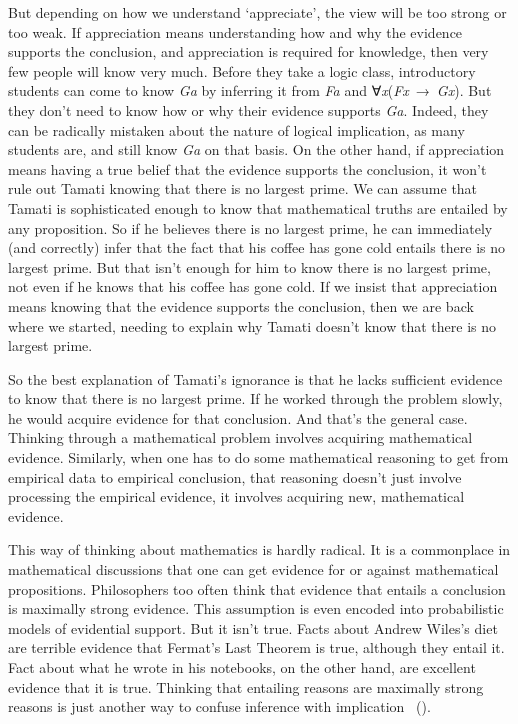 \documentclass[
  10pt,
  letterpaper,
  twoside]{scrbook}
\begin{document}
But depending on how we understand `appreciate', the view will be too
strong or too weak. If appreciation means understanding how and why the
evidence supports the conclusion, and appreciation is required for
knowledge, then very few people will know very much. Before they take a
logic class, introductory students can come to know \emph{Ga} by
inferring it from \emph{Fa} and ∀\emph{x}(\emph{Fx}~→~\emph{Gx}). But
they don't need to know how or why their evidence supports \emph{Ga}.
Indeed, they can be radically mistaken about the nature of logical
implication, as many students are, and still know \emph{Ga} on that
basis. On the other hand, if appreciation means having a true belief
that the evidence supports the conclusion, it won't rule out {Tamati}
knowing that there is no largest prime. We can assume that {Tamati} is
sophisticated enough to know that mathematical truths are entailed by
any proposition. So if he believes there is no largest prime, he can
immediately (and correctly) infer that the fact that his coffee has gone
cold entails there is no largest prime. But that isn't enough for him to
know there is no largest prime, not even if he knows that his coffee has
gone cold. If we insist that appreciation means knowing that the
evidence supports the conclusion, then we are back where we started,
needing to explain why {Tamati} doesn't know that there is no largest
prime.

So the best explanation of {Tamati}'s ignorance is that he lacks
sufficient evidence to know that there is no largest prime. If he worked
through the problem slowly, he would acquire evidence for that
conclusion. And that's the general case. Thinking through a mathematical
problem involves acquiring mathematical evidence. Similarly, when one
has to do some mathematical reasoning to get from empirical data to
empirical conclusion, that reasoning doesn't just involve processing the
empirical evidence, it involves acquiring new, mathematical evidence.

This way of thinking about mathematics is hardly radical. It is a
commonplace in mathematical discussions that one can get evidence for or
against mathematical propositions. Philosophers too often think that
evidence that entails a conclusion is maximally strong evidence. This
assumption is even encoded into probabilistic models of evidential
support. But it isn't true. Facts about Andrew Wiles's diet are terrible
evidence that Fermat's Last Theorem is true, although they entail it.
Fact about what he wrote in his notebooks, on the other hand, are
excellent evidence that it is true. Thinking that entailing reasons are
maximally strong reasons is just another way to confuse inference with
implication ~().
\end{document}
